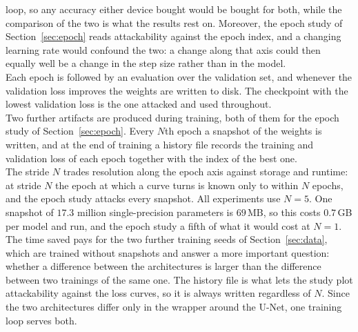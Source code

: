 \documentclass{article}
\numberwithin{equation}{section}
\begin{document}
loop, so any accuracy either device bought would be bought for both, while the
comparison of the two is what the results rest on. Moreover, the epoch study of
Section~\ref{sec:epoch} reads attackability against the epoch index, and a
changing learning rate would confound the two: a change along that axis could then
equally well be a change in the step size rather than in the model.\\
Each epoch is followed by an evaluation over the validation set, and whenever
the validation loss improves the weights are written to disk. The checkpoint
with the lowest validation loss is the one attacked and used throughout.\\
Two further artifacts are produced during training, both of them for the epoch
study of Section~\ref{sec:epoch}. Every $N$th epoch a snapshot of the weights is
written, and at the end of training a history file records the training and
validation loss of each epoch together with the index of the best one.\\
The stride $N$ trades resolution along the epoch axis against storage and runtime: at stride $N$ the
epoch at which a curve turns is known only to within $N$ epochs, and the epoch study attacks every
snapshot. All experiments use $N=5$. One snapshot of $17.3$ million single-precision parameters is
$69$\,MB, so this costs $0.7$\,GB per model and run, and the epoch study a fifth of what it would cost at
$N=1$. The time saved pays for the two further training seeds of Section~\ref{sec:data}, which are trained
without snapshots and answer a more important question: whether a difference between the architectures
is larger than the difference between two trainings of the same one.
The history file is what lets the study plot attackability against the loss curves,
so it is always written regardless of $N$. Since the two architectures differ only in the
wrapper around the U-Net, one training loop serves both.
\end{document}
